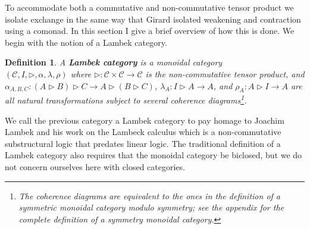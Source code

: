 \documentclass{sigplanconf}
\let\mto\to
\let\to\relax
\newcommand{\to}{\rightarrow}
\newcommand{\cat}[1]{\mathcal{#1}}
\newtheorem{definition}[theorem]{Definition}
\begin{document}

To accommodate both a commutative and non-commutative tensor product
we isolate exchange in the same way that Girard isolated weakening and
contraction using a comonad.  In this section I give a brief overview
of how this is done.  We begin with the notion of a Lambek category.
\begin{definition}
  \label{def:Lambek-category}
  A \textbf{Lambek category} is a monoidal category \\ $(\cat{C}, I,
  \rhd, \alpha, \lambda, \rho)$ where $\rhd : \cat{C} \times \cat{C}
  \mto \cat{C}$ is the non-commutative tensor product, and
  $\alpha_{A,B,C} : (A \rhd B) \rhd C \mto A \rhd (B \rhd C)$,
  $\lambda_A : I \rhd A \mto A$, and $\rho_A : A \rhd I \mto A$ are
  all natural transformations subject to several coherence
  diagrams\footnote{The coherence diagrams are equivalent to the ones
    in the definition of a symmetric monoidal category modulo
    symmetry; see the appendix for the complete definition of a
    symmetry monoidal category.}.
\end{definition}
\noindent
We call the previous category a Lambek category to pay homage to
Joachim Lambek and his work on the Lambeck calculus \cite{Lambek1958}
which is a non-commutative substructural logic that predates linear
logic.  The traditional definition of a Lambek category also requires
that the monoidal category be biclosed, but we do not concern
ourselves here with closed categories.
\end{document}

